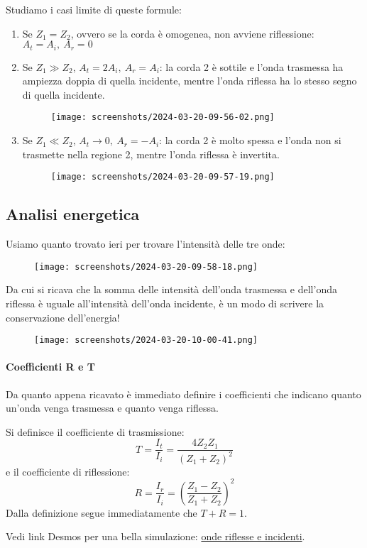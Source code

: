 Studiamo i casi limite di queste formule:
\begin{enumerate}
	\item Se \(Z_1 = Z_2\), ovvero se la corda è omogenea, non avviene riflessione: \(A_t = A_i,\ A_r = 0\) 
	\item Se \(Z_1 \gg Z_2\), \(A_t = 2A_i,\ A_r=A_i\): la corda 2 è sottile e l'onda trasmessa ha ampiezza doppia di quella incidente, mentre l'onda riflessa ha lo stesso segno di quella incidente.  
	\begin{figure}[H]
		\centering
		\texttt{[image: screenshots/2024-03-20-09-56-02.png]}
	\end{figure}
	\item Se \(Z_1 \ll Z_2\), \(A_t \to 0,\ A_r = -A_i\): la corda 2 è molto spessa e l'onda non si trasmette nella regione 2, mentre l'onda riflessa è invertita.
	\begin{figure}[H]
		\centering
		\texttt{[image: screenshots/2024-03-20-09-57-19.png]}
	\end{figure}  
\end{enumerate}
\subsection{Analisi energetica}
Usiamo quanto trovato ieri per trovare l'intensità delle tre onde:
\begin{figure}[H]
	\centering
	\texttt{[image: screenshots/2024-03-20-09-58-18.png]}
\end{figure}
Da cui si ricava che la somma delle intensità dell'onda trasmessa e dell'onda riflessa è uguale all'intensità dell'onda incidente, è un modo di scrivere la conservazione dell'energia!
\begin{figure}[H]
	\centering
	\texttt{[image: screenshots/2024-03-20-10-00-41.png]}
\end{figure}
\paragraph{Coefficienti R e T}
Da quanto appena ricavato è immediato definire i coefficienti che indicano quanto un'onda venga trasmessa e quanto venga riflessa.
\begin{definition}
	Si definisce il coefficiente di trasmissione:
	\[
		T= \frac{I_t}{I_i} = \frac{4Z_2 Z_1}{(Z_1 +Z_2)^{2} }
	\]
	e il coefficiente di riflessione:
	\[
		R= \frac{I_r}{I_i}=\left( \frac{Z_1 - Z_2}{Z_1 + Z_2} \right) ^{2} 
	\]
	Dalla definizione segue immediatamente che \(T+R=1\).
\end{definition}
Vedi link Desmos per una bella simulazione: \href{https://www.desmos.com/calculator/42zmaoac6h?lang=it}{onde riflesse e incidenti}.

